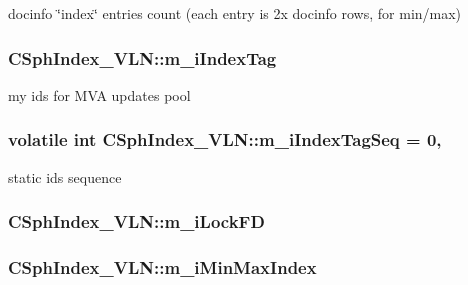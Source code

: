 docinfo \char`\"{}index\char`\"{} entries count (each entry is 2x docinfo rows, for min/max) 

\hypertarget{classCSphIndex__VLN_aca1f6d99738c9f0d8fd70c23d2ee325f}{
\subsubsection[{m\-\_\-i\-Index\-Tag}]{ C\-Sph\-Index\-\_\-\-V\-L\-N\-::m\-\_\-i\-Index\-Tag\hspace{0.3cm}{\ttfamily [private]}}}\label{classCSphIndex__VLN_aca1f6d99738c9f0d8fd70c23d2ee325f}


my ids for M\-V\-A updates pool 

\hypertarget{classCSphIndex__VLN_a44d22f219ec36276ff3af738922b9547}{
\subsubsection[{m\-\_\-i\-Index\-Tag\-Seq}]{\setlength{\rightskip}{0pt plus 5cm}volatile {\bf int} C\-Sph\-Index\-\_\-\-V\-L\-N\-::m\-\_\-i\-Index\-Tag\-Seq = 0\hspace{0.3cm}{\ttfamily [static]}, {\ttfamily [private]}}}\label{classCSphIndex__VLN_a44d22f219ec36276ff3af738922b9547}


static ids sequence 

\hypertarget{classCSphIndex__VLN_a52726c9aa707f16daf6c2ac9121dba4c}{
\subsubsection[{m\-\_\-i\-Lock\-F\-D}]{ C\-Sph\-Index\-\_\-\-V\-L\-N\-::m\-\_\-i\-Lock\-F\-D\hspace{0.3cm}{\ttfamily [private]}}}\label{classCSphIndex__VLN_a52726c9aa707f16daf6c2ac9121dba4c}
\hypertarget{classCSphIndex__VLN_aa1885ec7b19c3cbcd980dc8a83765864}{
\subsubsection[{m\-\_\-i\-Min\-Max\-Index}]{ C\-Sph\-Index\-\_\-\-V\-L\-N\-::m\-\_\-i\-Min\-Max\-Index\hspace{0.3cm}{\ttfamily [private]}}}\label{classCSphIndex__VLN_aa1885ec7b19c3cbcd980dc8a83765864}


